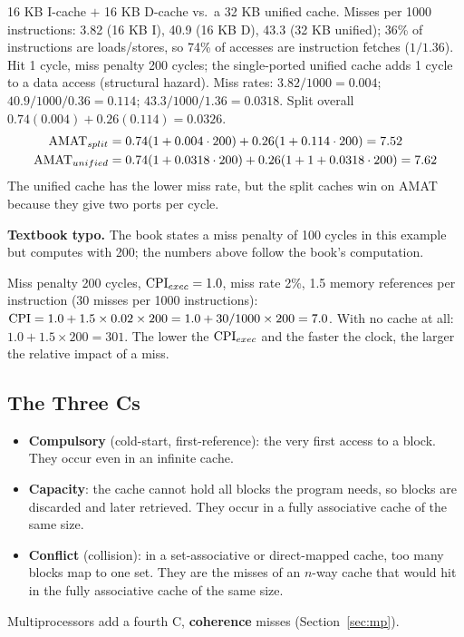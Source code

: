 \begin{eg}
16 KB I-cache $+$ 16 KB D-cache vs.\ a 32 KB unified cache. Misses per 1000
instructions: 3.82 (16 KB I), 40.9 (16 KB D), 43.3 (32 KB unified); 36\% of
instructions are loads/stores, so 74\% of accesses are instruction fetches
($1/1.36$). Hit 1 cycle, miss penalty 200 cycles; the single-ported unified cache
adds 1 cycle to a data access (structural hazard).
Miss rates: $3.82/1000=0.004$; $40.9/1000/0.36=0.114$;
$43.3/1000/1.36=0.0318$. Split overall $0.74(0.004)+0.26(0.114)=0.0326$.
\begin{align*}
  \mathrm{AMAT}_{split}&=0.74(1+0.004\cdot200)+0.26(1+0.114\cdot200)=7.52\\
  \mathrm{AMAT}_{unified}&=0.74(1+0.0318\cdot200)+0.26(1+1+0.0318\cdot200)=7.62
\end{align*}
The unified cache has the lower miss rate, but the split caches win on AMAT
because they give two ports per cycle.
\end{eg}
\begin{remark}
\textbf{Textbook typo.} The book states a miss penalty of 100 cycles in this
example but computes with 200; the numbers above follow the book's computation.
\end{remark}

\begin{eg}
Miss penalty 200 cycles, $\mathrm{CPI}_{exec}=1.0$, miss rate 2\%, 1.5 memory references
per instruction (30 misses per 1000 instructions):
$\mathrm{CPI}=1.0+1.5\times0.02\times200=1.0+30/1000\times200=7.0$. With no cache at all:
$1.0+1.5\times200=301$. The lower the $\mathrm{CPI}_{exec}$ and the faster the clock, the
larger the relative impact of a miss.
\end{eg}

\subsection{The Three Cs}
\label{sec:three-cs}

\begin{definition}
\begin{itemize}
  \item \textbf{Compulsory} (cold-start, first-reference): the very first access
  to a block. They occur even in an infinite cache.
  \item \textbf{Capacity}: the cache cannot hold all blocks the program needs, so
  blocks are discarded and later retrieved. They occur in a fully associative
  cache of the same size.
  \item \textbf{Conflict} (collision): in a set-associative or direct-mapped
  cache, too many blocks map to one set. They are the misses of an $n$-way cache
  that would hit in the fully associative cache of the same size.
\end{itemize}
Multiprocessors add a fourth C, \textbf{coherence} misses
(Section~\ref{sec:mp}).
\end{definition}

